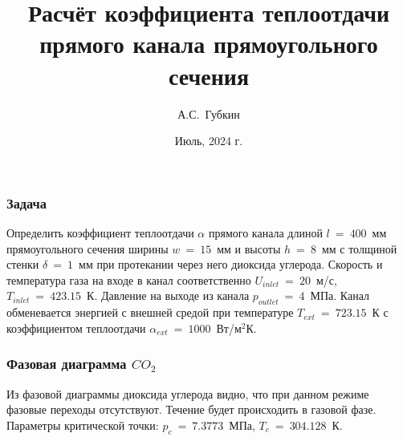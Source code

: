 \documentclass[10pt,xcolor={dvipsnames,table},aspectratio=169]{beamer}
\author[Губкин]{А.С.~Губкин}
\title[Расчёт коэффициента теплоотдачи прямого канала прямоугольного сечения]{Расчёт коэффициента теплоотдачи прямого канала прямоугольного сечения}
\date[Тюмень 2024]{Июль, 2024 г.}
\begin{document}
    \frame{\titlepage}

    \begin{frame}{}

        \justifying
        \normalsize

        \frametitle{Задача}

        Определить коэффициент теплоотдачи $ \alpha $ прямого канала длиной $ l~=~400$~мм прямоугольного сечения ширины $ w~=~15 $~мм и высоты $ h~=~8 $~мм с толщиной стенки $ \delta~=~1 $~мм при протекании через него диоксида углерода. Скорость и температура газа на входе в канал соответственно $ U_{inlet}~=~20 $~м/с, $ T_{inlet}~=~423.15 $~К. Давление на выходе из канала $ p_{outlet}~=~4 $~МПа. Канал обменевается энергией с внешней средой при температуре $ T_{ext}~=~723.15 $~К с коэффициентом теплоотдачи $ \alpha_{ext}~=~1000 $~Вт/м$^2$К.

    \end{frame}{}

    \begin{frame}{}

        \justifying
        \normalsize

        \frametitle{Фазовая диаграмма $CO_{2}$}

        \begin{minipage}[b]{0.49\linewidth}
            Из фазовой диаграммы диоксида углерода видно, что при данном режиме фазовые переходы отсутствуют. Течение будет происходить в газовой фазе. \\

            Параметры критической точки: $ p_{c}~=~7.3773 $~МПа, $ T_{c}~=~304.128 $~К.
        \end{minipage}
        \hfill
        \begin{minipage}{0.49\linewidth}
            \begin{figure}
                \centering
                
            \end{figure}
        \end{minipage}

    \end{frame}{}
\end{document}
